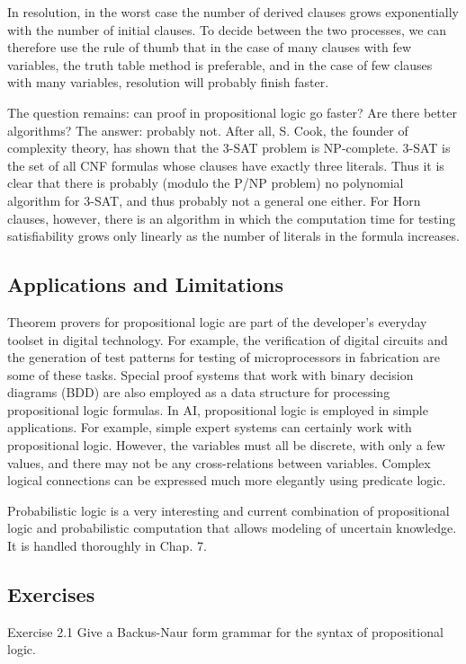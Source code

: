 \documentclass[10pt]{book}
\begin{document}
In resolution, in the worst case the number of derived clauses grows exponentially with the number of initial clauses. To decide between the two processes, we can therefore use the rule of thumb that in the case of many clauses with few variables, the truth table method is preferable, and in the case of few clauses with many variables, resolution will probably finish faster.

The question remains: can proof in propositional logic go faster? Are there better algorithms? The answer: probably not. After all, S. Cook, the founder of complexity theory, has shown that the 3-SAT problem is NP-complete. 3-SAT is the set of all CNF formulas whose clauses have exactly three literals. Thus it is clear that there is probably (modulo the P/NP problem) no polynomial algorithm for 3-SAT, and thus probably not a general one either. For Horn clauses, however, there is an algorithm in which the computation time for testing satisfiability grows only linearly as the number of literals in the formula increases.

\subsection{Applications and Limitations}
Theorem provers for propositional logic are part of the developer's everyday toolset in digital technology. For example, the verification of digital circuits and the generation of test patterns for testing of microprocessors in fabrication are some of these tasks. Special proof systems that work with binary decision diagrams (BDD) are also employed as a data structure for processing propositional logic formulas.
In AI, propositional logic is employed in simple applications. For example, simple expert systems can certainly work with propositional logic. However, the variables must all be discrete, with only a few values, and there may not be any cross-relations between variables. Complex logical connections can be expressed much more elegantly using predicate logic.

Probabilistic logic is a very interesting and current combination of propositional logic and probabilistic computation that allows modeling of uncertain knowledge. It is handled thoroughly in Chap. 7.

\subsection{Exercises}
Exercise 2.1 Give a Backus-Naur form grammar for the syntax of propositional logic.
\end{document}
